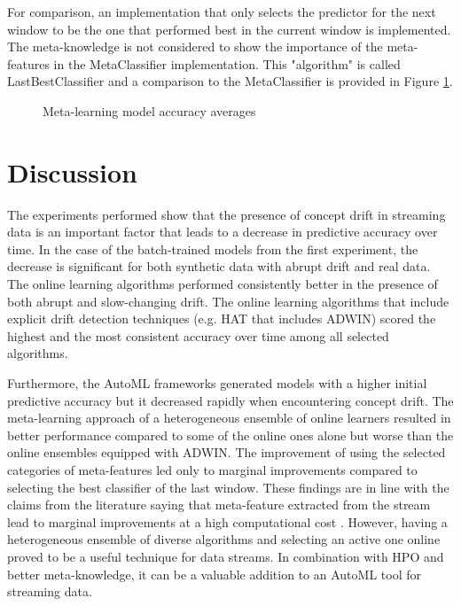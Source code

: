 \documentclass{sig-alternate-br}
\begin{document}
For comparison, an implementation that only selects the predictor for the next window to be the one that performed best in the current window is implemented. The meta-knowledge is not considered to show the importance of the meta-features in the MetaClassifier implementation. This "algorithm" is called LastBestClassifier and a comparison to the MetaClassifier is provided in Figure \ref{fig:meta_violin}.

\begin{figure}[h]
\centering 
{}
\caption{Meta-learning model accuracy averages}
\label{fig:meta_violin}
\end{figure}


\section{Discussion}

The experiments performed show that the presence of concept drift in streaming data is an important factor that leads to a decrease in predictive accuracy over time. In the case of the batch-trained models from the first experiment, the decrease is significant for both synthetic data with abrupt drift and real data. The online learning algorithms performed consistently better in the presence of both abrupt and slow-changing drift. The online learning algorithms that include explicit drift detection techniques (e.g. HAT that includes ADWIN) scored the highest and the most consistent accuracy over time among all selected algorithms.

Furthermore, the AutoML frameworks generated models with a higher initial predictive accuracy but it decreased rapidly when encountering concept drift. The meta-learning approach of a heterogeneous ensemble of online learners resulted in better performance compared to some of the online ones alone but worse than the online ensembles equipped with ADWIN. The improvement of using the selected categories of meta-features led only to marginal improvements compared to selecting the best classifier of the last window. These findings are in line with the claims from the literature saying that meta-feature extracted from the stream lead to marginal improvements at a high computational cost \cite{van2018online}. However, having a heterogeneous ensemble of diverse algorithms and selecting an active one online proved to be a useful technique for data streams. In combination with HPO and better meta-knowledge, it can be a valuable addition to an AutoML tool for streaming data. 
\end{document}
